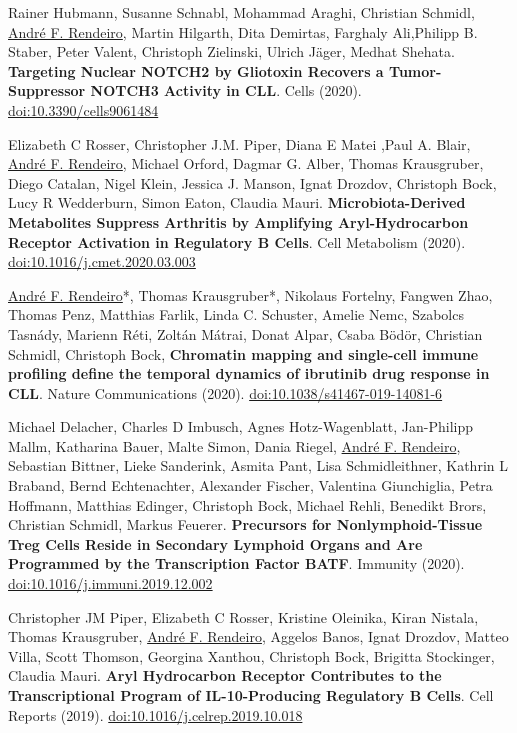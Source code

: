 \documentclass[11pt,a4paper,roman]{moderncv} %
\begin{document}
\begin{etaremune}[leftmargin=1.0cm, itemindent=0pt, topsep=10pt, itemsep=2pt, partopsep=0pt, parsep=0pt]
        \item Rainer Hubmann, Susanne Schnabl, Mohammad Araghi, Christian Schmidl, \underline{André F. Rendeiro}, Martin Hilgarth, Dita Demirtas, Farghaly Ali,Philipp B. Staber, Peter Valent, Christoph Zielinski, Ulrich Jäger, Medhat Shehata. \textbf{Targeting Nuclear NOTCH2 by Gliotoxin Recovers a Tumor-Suppressor NOTCH3 Activity in CLL}. Cells (2020).
        \href{http://dx.doi.org/10.3390/cells9061484}{doi:10.3390/cells9061484}

        \item Elizabeth C Rosser, Christopher J.M. Piper, Diana E Matei ,Paul A. Blair, \underline{André F. Rendeiro}, Michael Orford, Dagmar G. Alber, Thomas Krausgruber, Diego Catalan, Nigel Klein, Jessica J. Manson, Ignat Drozdov, Christoph Bock, Lucy R Wedderburn, Simon Eaton, Claudia Mauri. \textbf{Microbiota-Derived Metabolites Suppress Arthritis by Amplifying Aryl-Hydrocarbon Receptor Activation in Regulatory B Cells}. Cell Metabolism (2020).
        \href{https://dx.doi.org/10.1016/j.cmet.2020.03.003}{doi:10.1016/j.cmet.2020.03.003}

        \item \underline{André F. Rendeiro}*, Thomas Krausgruber*, Nikolaus Fortelny, Fangwen Zhao, Thomas Penz, Matthias Farlik, Linda C. Schuster, Amelie Nemc, Szabolcs Tasnády, Marienn Réti, Zoltán Mátrai, Donat Alpar, Csaba Bödör, Christian Schmidl, Christoph Bock, \textbf{Chromatin mapping and single-cell immune profiling define the temporal dynamics of ibrutinib drug response in CLL}. Nature Communications (2020).
        \href{https://dx.doi.org/10.1038/s41467-019-14081-6}{doi:10.1038/s41467-019-14081-6}

        \item Michael Delacher, Charles D Imbusch, Agnes Hotz-Wagenblatt, Jan-Philipp Mallm, Katharina Bauer, Malte Simon, Dania Riegel, \underline{André F. Rendeiro}, Sebastian Bittner, Lieke Sanderink, Asmita Pant, Lisa Schmidleithner, Kathrin L Braband, Bernd Echtenachter, Alexander Fischer, Valentina Giunchiglia, Petra Hoffmann, Matthias Edinger, Christoph Bock, Michael Rehli, Benedikt Brors, Christian Schmidl, Markus Feuerer. \textbf{Precursors for Nonlymphoid-Tissue Treg Cells Reside in Secondary Lymphoid Organs and Are Programmed by the Transcription Factor BATF}. Immunity (2020).
        \href{https://dx.doi.org/doi:10.1016/j.immuni.2019.12.002}{doi:10.1016/j.immuni.2019.12.002}

        \item Christopher JM Piper, Elizabeth C Rosser, Kristine Oleinika, Kiran Nistala, Thomas Krausgruber, \underline{André F. Rendeiro}, Aggelos Banos, Ignat Drozdov, Matteo Villa, Scott Thomson, Georgina Xanthou, Christoph Bock, Brigitta Stockinger, Claudia Mauri. \textbf{Aryl Hydrocarbon Receptor Contributes to the Transcriptional Program of IL-10-Producing Regulatory B Cells}. Cell Reports (2019).
        \href{https://dx.doi.org/10.1016/j.celrep.2019.10.018}{doi:10.1016/j.celrep.2019.10.018}


\end{etaremune}
\end{document}
